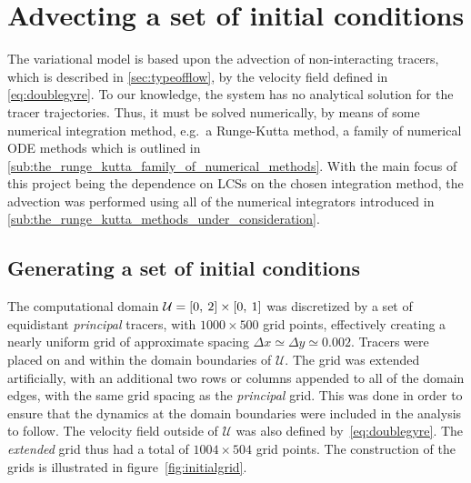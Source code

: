 \section{Advecting a set of initial conditions}
\label{sec:advecting_a_set_of_initial_conditions}

The variational model is based upon the advection of non-interacting tracers,
which is described in \cref{sec:typeofflow}, by the velocity field defined in
\cref{eq:doublegyre}. To our knowledge, the system has no analytical
solution for the tracer trajectories. Thus, it must be solved numerically, by
means of some numerical integration method, e.g.\ a Runge-Kutta method, a
family of numerical ODE methods which is outlined in
\cref{sub:the_runge_kutta_family_of_numerical_methods}. With the main focus of
this project being the dependence on LCSs on the chosen integration method, the
advection was performed using all of the numerical integrators introduced in
\cref{sub:the_runge_kutta_methods_under_consideration}.

\subsection{Generating a set of initial conditions}
\label{sub:generating_a_set_of_initial_conditions}
The computational domain $\mathcal{U}=[0,\hspace{0.5ex}2]\times[0,\hspace{0.5ex}1]$
was discretized by a set of equidistant \emph{principal} tracers, with
$1000\times500$  grid points, effectively creating a nearly uniform grid of
approximate spacing $\Delta{x}\simeq\Delta{y}\simeq0.002$. Tracers were placed
on and within the domain boundaries of $\mathcal{U}$. The grid was extended
artificially, with an additional two rows or columns appended to all of the
domain edges, with the same grid spacing as the \emph{principal} grid. This was
done in order  to ensure that the dynamics at the domain boundaries were
included in the analysis to follow. The velocity field outside of
$\mathcal{U}$ was also defined by~\cref{eq:doublegyre}. The
\emph{extended} grid thus had a total of $1004\times504$ grid points.
The construction of the grids is illustrated in figure~\ref{fig:initialgrid}.
\clearpage



